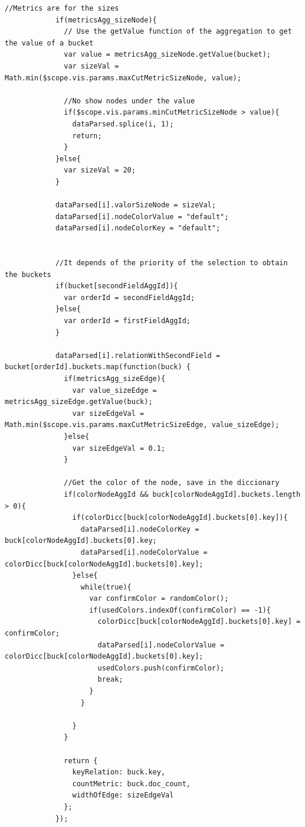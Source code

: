 \documentclass[a4paper, 12pt]{book}
\begin{document}
\begin{lstlisting}[frame=single]
            //Metrics are for the sizes
            if(metricsAgg_sizeNode){
              // Use the getValue function of the aggregation to get the value of a bucket
              var value = metricsAgg_sizeNode.getValue(bucket);
              var sizeVal = Math.min($scope.vis.params.maxCutMetricSizeNode, value);

              //No show nodes under the value
              if($scope.vis.params.minCutMetricSizeNode > value){
                dataParsed.splice(i, 1);
                return;
              }
            }else{
              var sizeVal = 20;
            }

            dataParsed[i].valorSizeNode = sizeVal;
            dataParsed[i].nodeColorValue = "default";
            dataParsed[i].nodeColorKey = "default";


            //It depends of the priority of the selection to obtain the buckets
            if(bucket[secondFieldAggId]){
              var orderId = secondFieldAggId;
            }else{
              var orderId = firstFieldAggId;
            }

            dataParsed[i].relationWithSecondField = bucket[orderId].buckets.map(function(buck) {
              if(metricsAgg_sizeEdge){
                var value_sizeEdge = metricsAgg_sizeEdge.getValue(buck);
                var sizeEdgeVal = Math.min($scope.vis.params.maxCutMetricSizeEdge, value_sizeEdge);
              }else{
                var sizeEdgeVal = 0.1;
              }

              //Get the color of the node, save in the diccionary
              if(colorNodeAggId && buck[colorNodeAggId].buckets.length > 0){
                if(colorDicc[buck[colorNodeAggId].buckets[0].key]){
                  dataParsed[i].nodeColorKey = buck[colorNodeAggId].buckets[0].key;
                  dataParsed[i].nodeColorValue = colorDicc[buck[colorNodeAggId].buckets[0].key];
                }else{
                  while(true){
                    var confirmColor = randomColor();
                    if(usedColors.indexOf(confirmColor) == -1){
                      colorDicc[buck[colorNodeAggId].buckets[0].key] = confirmColor;
                      dataParsed[i].nodeColorValue = colorDicc[buck[colorNodeAggId].buckets[0].key];
                      usedColors.push(confirmColor);
                      break;
                    }
                  }

                }
              }

              return {
                keyRelation: buck.key,
                countMetric: buck.doc_count,
                widthOfEdge: sizeEdgeVal
              };
            });


\end{lstlisting}
\end{document}
